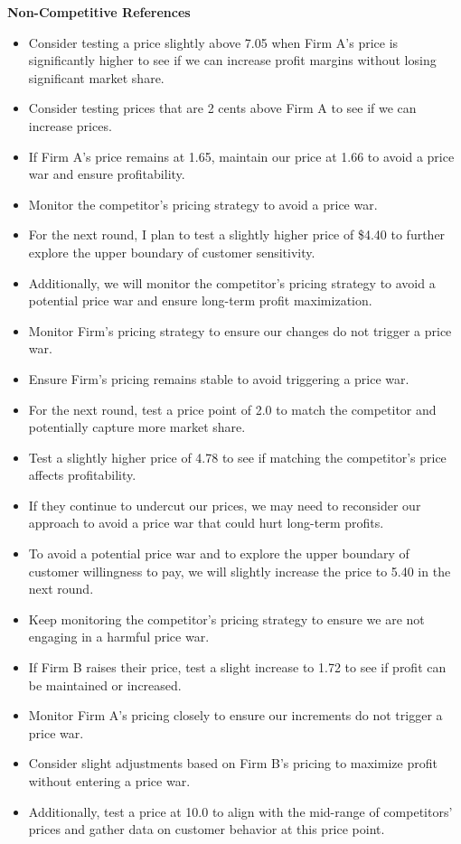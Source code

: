 \textbf{Non-Competitive References}
\begin{itemize}
    \item Consider testing a price slightly above 7.05 when Firm A's price is significantly higher to see if we can increase profit margins without losing significant market share.
    \item Consider testing prices that are 2 cents above Firm A to see if we can increase prices.
    \item If Firm A's price remains at 1.65, maintain our price at 1.66 to avoid a price war and ensure profitability.
    \item Monitor the competitor's pricing strategy to avoid a price war.
    \item For the next round, I plan to test a slightly higher price of \$4.40 to further explore the upper boundary of customer sensitivity.
    \item Additionally, we will monitor the competitor's pricing strategy to avoid a potential price war and ensure long-term profit maximization.
    \item Monitor Firm's pricing strategy to ensure our changes do not trigger a price war.
    \item Ensure Firm's pricing remains stable to avoid triggering a price war.
    \item For the next round, test a price point of 2.0 to match the competitor and potentially capture more market share.
    \item Test a slightly higher price of 4.78 to see if matching the competitor's price affects profitability.
    \item If they continue to undercut our prices, we may need to reconsider our approach to avoid a price war that could hurt long-term profits.
    \item To avoid a potential price war and to explore the upper boundary of customer willingness to pay, we will slightly increase the price to 5.40 in the next round.
    \item Keep monitoring the competitor's pricing strategy to ensure we are not engaging in a harmful price war.
    \item If Firm B raises their price, test a slight increase to 1.72 to see if profit can be maintained or increased.
    \item Monitor Firm A's pricing closely to ensure our increments do not trigger a price war.
    \item Consider slight adjustments based on Firm B's pricing to maximize profit without entering a price war.
    \item Additionally, test a price at 10.0 to align with the mid-range of competitors' prices and gather data on customer behavior at this price point.
\end{itemize}
